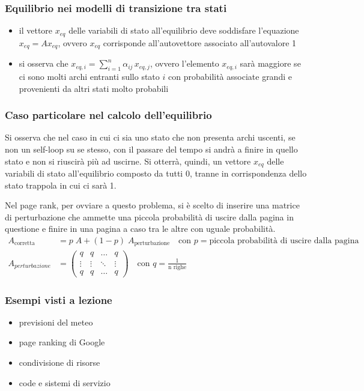 \subsubsection*{Equilibrio nei modelli di transizione tra stati}
\begin{itemize}
	\item il vettore \(x_{eq}\) delle variabili di stato all'equilibrio deve soddisfare l'equazione \(x_{eq} = A x_{eq}\), ovvero
	\(x_{eq}\) corrisponde all'autovettore associato all'autovalore 1
	\item si osserva che \(\displaystyle x_{eq,i} = \sum_{i=1}^{n} \alpha_{ij} \, x_{eq,j}\), ovvero l'elemento \(x_{eq,i}\) sarà maggiore
	se ci sono molti archi entranti sullo stato \(i\) con probabilità associate grandi e provenienti da altri stati molto probabili
\end{itemize}

\newpage

\subsubsection*{Caso particolare nel calcolo dell'equilibrio}
Si osserva che nel caso in cui ci sia uno stato che non presenta archi uscenti, se non un self-loop su se stesso, con il passare
del tempo si andrà a finire in quello stato e non si riuscirà più ad uscirne. Si otterrà, quindi, un vettore \(x_{eq}\) delle
variabili di stato all'equilibrio composto da tutti 0, tranne in corrispondenza dello stato trappola in cui ci sarà 1.

Nel page rank, per ovviare a questo problema, si è scelto di inserire una matrice di perturbazione che ammette una piccola
probabilità di uscire dalla pagina in questione e finire in una pagina a caso tra le altre con uguale probabilità.
\begin{align*}
	A_\text{corretta} &= p \; A + (1-p) \; A_\text{perturbazione} \quad \text{con } p = \text{piccola probabilità di uscire dalla pagina} \\[5pt]
	A_{perturbazione} &= \left(\begin{matrix} q & q & \dots & q \\ \vdots & \vdots & \ddots & \vdots \\ q & q & \dots & q \end{matrix}\right) \quad \text{con } q = \frac{1}{\text{n righe}}
\end{align*}

\subsubsection*{Esempi visti a lezione}
\begin{itemize}
	\item previsioni del meteo
	\item page ranking di Google
	\item condivisione di risorse
	\item code e sistemi di servizio
\end{itemize}

